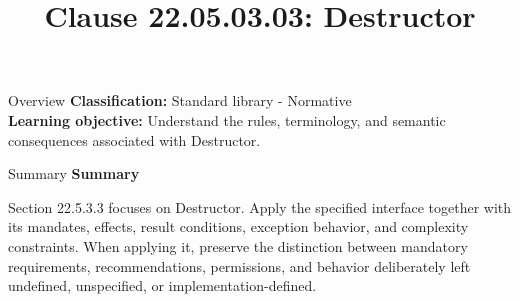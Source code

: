 \documentclass[10pt,letterpaper]{article}
\title{Clause 22.05.03.03: Destructor}
\author{}
\date{}
\begin{document}
\maketitle
\begin{CornellOverviewBox}{Overview}
\textbf{Classification:} Standard library - Normative\\[2pt]
\textbf{Learning objective:} Understand the rules, terminology, and semantic consequences associated with Destructor.
\end{CornellOverviewBox}\begin{CornellSummaryBox}{Summary}
{\sffamily\bfseries\color{Accent} Summary}\par\vspace{3pt}Section 22.5.3.3 focuses on Destructor. Apply the specified interface together with its mandates, effects, result conditions, exception behavior, and complexity constraints. When applying it, preserve the distinction between mandatory requirements, recommendations, permissions, and behavior deliberately left undefined, unspecified, or implementation-defined.
\end{CornellSummaryBox}
\end{document}
